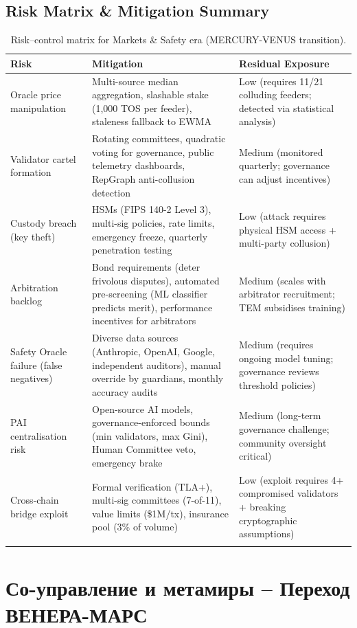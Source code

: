 \documentclass[11pt]{article}
\begin{document}
\subsection{Risk Matrix \& Mitigation Summary}
\begin{longtable}{@{}p{}p{}p{}@{}}
\toprule
\textbf{Risk} & \textbf{Mitigation} & \textbf{Residual Exposure} \\\midrule
Oracle price manipulation & Multi-source median aggregation, slashable stake (1,000 TOS per feeder), staleness fallback to EWMA & Low (requires 11/21 colluding feeders; detected via statistical analysis) \\
Validator cartel formation & Rotating committees, quadratic voting for governance, public telemetry dashboards, RepGraph anti-collusion detection & Medium (monitored quarterly; governance can adjust incentives) \\
Custody breach (key theft) & HSMs (FIPS 140-2 Level 3), multi-sig policies, rate limits, emergency freeze, quarterly penetration testing & Low (attack requires physical HSM access + multi-party collusion) \\
Arbitration backlog & Bond requirements (deter frivolous disputes), automated pre-screening (ML classifier predicts merit), performance incentives for arbitrators & Medium (scales with arbitrator recruitment; TEM subsidises training) \\
Safety Oracle failure (false negatives) & Diverse data sources (Anthropic, OpenAI, Google, independent auditors), manual override by guardians, monthly accuracy audits & Medium (requires ongoing model tuning; governance reviews threshold policies) \\
PAI centralisation risk & Open-source AI models, governance-enforced bounds (min validators, max Gini), Human Committee veto, emergency brake & Medium (long-term governance challenge; community oversight critical) \\
Cross-chain bridge exploit & Formal verification (TLA+), multi-sig committees (7-of-11), value limits (\$1M/tx), insurance pool (3\% of volume) & Low (exploit requires 4+ compromised validators + breaking cryptographic assumptions) \\\bottomrule
\caption{Risk--control matrix for Markets \& Safety era (MERCURY-VENUS transition).}
\label{tab:risk-markets-expanded}
\end{longtable}

\section{Со-управление и метамиры -- Переход ВЕНЕРА-МАРС}
\end{document}
